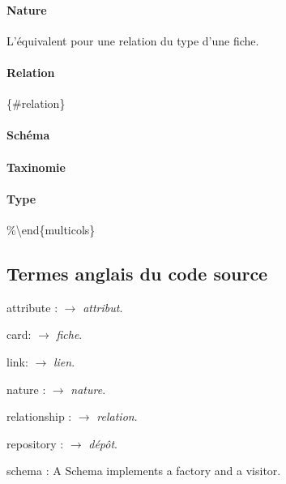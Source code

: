 \documentclass[11pt]{article}
\newcommand\cf[1]{$\to$ \textit{#1}.}
\begin{document}
\paragraph{Nature}\label{nature}

L'équivalent pour une relation du type d'une fiche.

\paragraph{Relation}\label{relation}

\{\#relation\}

\paragraph{Schéma}\label{schuxe9ma}

\paragraph{Taxinomie}\label{taxinomie}

\paragraph{Type}\label{type}

\%\textbackslash{}end\{multicols\}

\subsection{Termes anglais du code
source}\label{termes-anglais-du-code-source}

\begin{multicols}{3}
attribute
:   \cf{attribut}

card:
    \cf{fiche}
    
link:
    \cf{lien}
    
nature
:   \cf{nature}

relationship
:   \cf{relation}

repository
:    \cf{dépôt}

schema
:   A Schema implements a factory and a visitor. 


\end{multicols}
\end{document}
